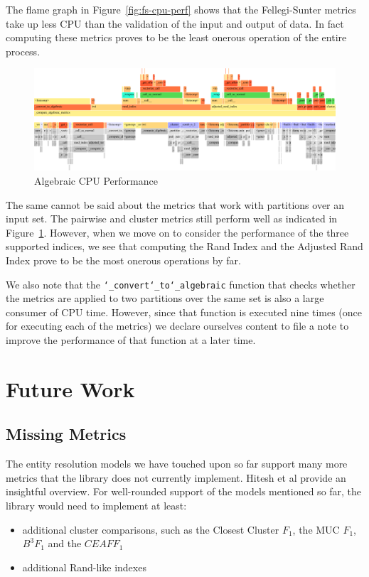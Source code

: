 \documentclass[11pt]{article}
\begin{document}
    The flame graph in Figure~\ref{fig:fs-cpu-perf}
    shows that the Fellegi-Sunter metrics take up less CPU than the validation
    of the input and output of data.
    In fact computing these metrics proves to be the least onerous operation of
    the entire process.

    \begin{figure}[h!]
        \includegraphics[width=\textwidth]{performance/algebraic-flamegraph}
        \caption{Algebraic CPU Performance}\label{fig:alg-cpu-perf}
    \end{figure}
    
    The same cannot be said about the metrics that work with partitions over an
    input set.
    The pairwise and cluster metrics still perform well as indicated in
    Figure~\ref{fig:alg-cpu-perf}.
    However, when we move on to consider the performance of the three supported
    indices, we see that computing the Rand Index and the Adjusted Rand Index
    prove to be the most onerous operations by far.

    We also note that the \texttt{\char`_convert\char`_to\char`_algebraic}
    function that checks whether the metrics are applied to two partitions over
    the same set is also a large consumer of CPU time.
    However, since that function is executed nine times (once for executing each
    of the metrics) we declare ourselves content to file a note to improve the
    performance of that function at a later time.

    \section{Future Work}\label{sec:future}

    \subsection{Missing Metrics}

    The entity resolution models we have touched upon so far support many more
    metrics that the library does not currently implement.
    Hitesh et al provide an insightful overview\cite{hitesh2012}.
    For well-rounded support of the models mentioned so far, the library would
    need to implement at least:
    \begin{itemize}
        \item additional cluster comparisons, such as the Closest Cluster $F_1$, the
        MUC $F_1$, $B^3 F_1$ and the $CEAF F_1$\cite{hitesh2012}
        \item additional Rand-like indexes\cite{warrens2022understanding}
    \end{itemize}
\end{document}

